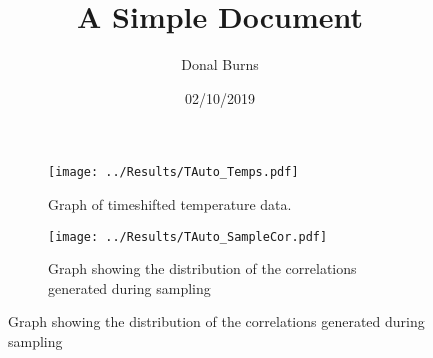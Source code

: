 \documentclass[a4paper, 12pt]{article}
\title{A Simple Document}
\author{Donal Burns}
\date{02/10/2019}
\begin{document}
  \maketitle
  
\begin{figure}[h!]
    \centering
    \begin{subfigure}[t]{0.4\linewdth}    
    \texttt{[image: ../Results/TAuto\_Temps.pdf]}
    \caption{Graph of timeshifted temperature data.}
    \label{Figure 1}
    \end{subfigure}


    \begin{subfigure}[t]{0.4\linewdth} 
    \texttt{[image: ../Results/TAuto\_SampleCor.pdf]}
    \caption{Graph showing the distribution of the correlations generated during sampling}
    \label{Figure 2}
    \end{subfigure}
\end{figure}
\end{document}
